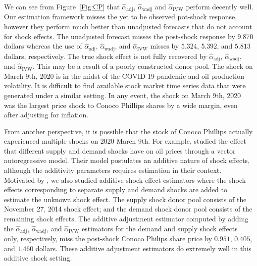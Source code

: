 \documentclass[11pt]{article}
\theoremstyle{definition}
\begin{document}
We can see from Figure~\ref{Fig:CP} that $\hat{\alpha}_{\text{adj}}$, $\hat{\alpha}_{\text{wadj}}$ and $\hat{\alpha}_{\text{IVW}}$ perform decently well. Our estimation framework misses the yet to be observed pot-shock response, however they perform much better than unadjusted forecasts that do not account for shock effects. The unadjusted forecast misses the post-shock response by 9.870 dollars whereas 
the use of $\hat{\alpha}_{\text{adj}}$, $\hat{\alpha}_{\text{wadj}}$, and $\hat{\alpha}_{\text{IVW}}$ misses by $5.324$, $5.392$, and $5.813$ dollars, respectively. 
The true shock effect is not fully recovered by $\hat{\alpha}_{\text{adj}}$, $\hat{\alpha}_{\text{wadj}}$, and $\hat{\alpha}_{\text{IVW}}$. This may be a result of a poorly constructed donor pool. The shock on March 9th, 2020 is in the midst of the COVID-19 pandemic and oil production volatility. It is difficult to find available stock market time series data that were generated under a similar setting. In any event, the shock on March 9th, 2020 was the largest price shock to Conoco Phillips shares by a wide margin, even after adjusting for inflation.


From another perspective, it is possible that the stock of Conoco Phillips actually experienced multiple shocks on 2020 March 9th. For example, \citet{kilian2009not} studied the effect that different supply and demand shocks have on oil prices through a vector autoregressive model. Their model postulates an additive nature of shock effects, although the additivity parameters requires estimation in their context. Motivated by \citet{kilian2009not}, we also studied additive shock effect estimators where the shock effects corresponding to separate supply and demand shocks are added to estimate the unknown shock effect. The supply shock donor pool consists of the November 27, 2014 shock effect; and the demand shock donor pool consists of the remaining shock effects. The additive adjustment estimator computed by adding the $\hat{\alpha}_{\text{adj}}$, $\hat{\alpha}_{\text{wadj}}$, and $\hat{\alpha}_{\text{IVW}}$ estimators for the demand and supply shock effects only, respectively, miss the post-shock Conoco Philips share price by $0.951$, $0.405$, and $1.460$ dollars. These additive adjustment estimators do extremely well in this additive shock setting. 
\end{document}
